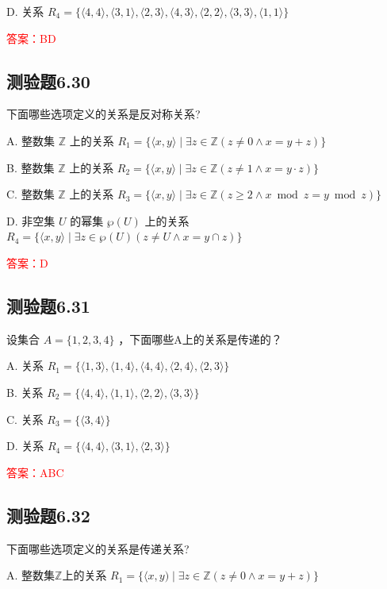 \documentclass[UTF8, heading=true]{ctexart}
\begin{document}
D. 关系 $R_4 = \{\langle 4,4\rangle, \langle 3,1\rangle, \langle 2,3\rangle, \langle 4,3\rangle, \langle 2,2\rangle, \langle 3,3\rangle, \langle 1,1\rangle\}$


\textcolor{red}{答案：BD}

\subsection{测验题6.30}

下面哪些选项定义的关系是反对称关系?

A. 整数集 $\mathbb{Z}$ 上的关系 $R_1=\{\langle x, y\rangle \mid \exists z \in \mathbb{Z}(z \neq 0 \wedge x=y+z)\}$

B. 整数集 $\mathbb{Z}$ 上的关系 $R_2=\{\langle x, y\rangle \mid \exists z \in \mathbb{Z}(z \neq 1 \wedge x=y \cdot z)\}$

C. 整数集 $\mathbb{Z}$ 上的关系 $R_3=\{\langle x, y\rangle \mid \exists z \in \mathbb{Z}(z \geq 2 \wedge x \bmod z=y \bmod z)\}$

D. 非空集 $U$ 的幂集 $\wp(U)$ 上的关系 $R_4=\{\langle x, y\rangle \mid \exists z \in \wp(U)(z \neq U \wedge x=y \cap z)\}$

\textcolor{red}{答案：D}

\subsection{测验题6.31}

设集合 $A=\{1,2,3,4\}$ ，下面哪些A上的关系是传递的？

A. 关系 $R_1=\{\langle 1,3\rangle,\langle 1,4\rangle,\langle 4,4\rangle,\langle 2,4\rangle,\langle 2,3\rangle\}$

B. 关系 $R_2=\{\langle 4,4\rangle,\langle 1,1\rangle,\langle 2,2\rangle,\langle 3,3\rangle\}$

C. 关系 $R_3=\{\langle 3,4\rangle\}$

D. 关系 $R_4=\{\langle 4,4\rangle,\langle 3,1\rangle,\langle 2,3\rangle\}$


\textcolor{red}{答案：ABC}

\subsection{测验题6.32}

下面哪些选项定义的关系是传递关系?

A. 整数集$\mathbb{Z}$上的关系 $R_1=\{\langle x, y) \mid \exists z \in \mathbb{Z}(z \neq 0 \wedge x=y+z)\}$
\end{document}
